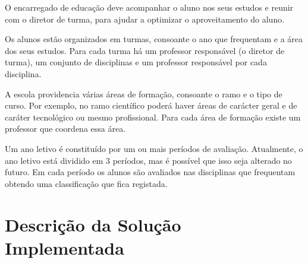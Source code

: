 \documentclass[12pt,a4paper,reqno]{report}
\numberwithin{figure}{section}
\numberwithin{equation}{section}
\begin{document}
O encarregado de educação deve acompanhar o aluno nos seus estudos e reunir com o diretor de turma, para ajudar a optimizar o aproveitamento do aluno.

Os alunos estão organizados em turmas, consoante o ano que frequentam e a área dos seus estudos. Para cada turma há um professor responsável (o diretor de turma), um conjunto de disciplinas e um professor responsável por cada disciplina.

A escola providencia várias áreas de formação, consoante o ramo e o tipo de curso. Por exemplo, no ramo científico poderá haver áreas de carácter geral e de caráter tecnológico ou mesmo profissional. Para cada área de formação existe um professor que coordena essa área.

Um ano letivo é constituído por um ou mais períodos de avaliação. Atualmente, o ano letivo está dividido em 3 períodos, mas é possível que isso seja alterado no futuro. Em cada período os alunos são avaliados nas disciplinas que frequentam obtendo uma classificação que fica registada.

\chapter{Descrição da Solução Implementada}
\end{document}
